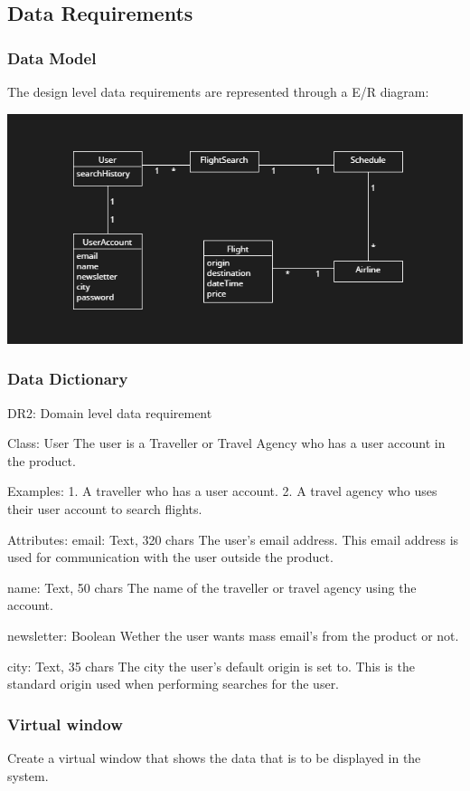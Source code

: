 \subsection{Data Requirements}

\subsubsection{Data Model}
The design level data requirements are represented through a E/R diagram:

\includegraphics{resources/dataRelations.PNG}

\subsubsection{Data Dictionary}

DR2: Domain level data requirement

Class: User
The user is a Traveller or Travel Agency who has a user account in the product.

Examples:
1. A traveller who has a user account.
2. A travel agency who uses their user account to search flights.

Attributes:
email:      Text, 320 chars
            The user's email address. This email address is used for communication with the user outside the product.

name:       Text, 50 chars
            The name of the traveller or travel agency using the account.

newsletter: Boolean
            Wether the user wants mass email's from the product or not.

city:       Text, 35 chars
            The city the user's default origin is set to. This is the standard origin used when performing searches for the user.

\subsubsection{Virtual window}
Create a virtual window that shows the data that is to be displayed in the system. 

